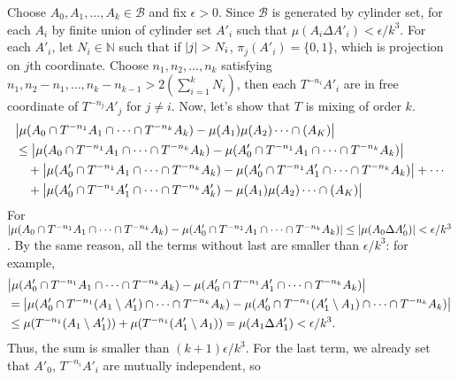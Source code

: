 \documentclass[12pt]{article}
\newenvironment{problem}[2][Problem]{\begin{trivlist}
\item[\hskip \labelsep {\bfseries #1}\hskip \labelsep {\bfseries #2.}]}{\end{trivlist}}
\begin{document}
\begin{problem}{6}
\end{problem}
Choose $A_0, A_1, \ldots, A_k\in \mathcal{B}$ and fix $\epsilon>0$. Since $\mathcal{B}$ is generated by cylinder set, for each $A_i$ by finite union of cylinder set $A'_i$ such that $\mu(A_i\Delta A'_i)<\epsilon/k^3$. For each $A'_i$, let $N_i\in\mathbb{N}$ such that if $\abs{j}>N_i$, $\pi_j(A'_i)=\{0,1\}$, which is projection on $j$th coordinate. Choose $n_1, n_2, \ldots, n_k$ satisfying $n_1, n_2-n_1, \ldots, n_k-n_{k-1}>2\left(\sum\limits_{i=1}^k N_i\right)$, then each $T^{-n_i}A'_i$ are in free coordinate of $T^{-n_j}A'_j$ for $j\neq i$. Now, let's show that $T$ is mixing of order $k$.
\begin{equation*}
    \begin{split}
        &\abs{\mu(A_0\cap T^{-n_1}A_1\cap\cdots\cap T^{-n_k}A_k)-\mu(A_1)\mu (A_2)\cdots \cap(A_K)}\\
        &\leq \abs{\mu(A_0\cap T^{-n_1}A_1\cap\cdots\cap T^{-n_k}A_k)-\mu(A'_0\cap T^{-n_1}A_1\cap\cdots\cap T^{-n_k}A_k)}\\
        & \quad+\abs{\mu(A'_0\cap T^{-n_1}A_1\cap\cdots\cap T^{-n_k}A_k)-\mu(A'_0\cap T^{-n_1}A'_1\cap\cdots\cap T^{-n_k}A_k)}+\cdots\\
        & \quad+\abs{\mu(A'_0\cap T^{-n_1}A'_1\cap\cdots\cap T^{-n_k}A'_k)-\mu(A_1)\mu (A_2)\cdots \cap(A_K)}
    \end{split}
\end{equation*}
For $\abs{\mu(A_0\cap T^{-n_1}A_1\cap\cdots\cap T^{-n_k}A_k)-\mu(A'_0\cap T^{-n_1}A_1\cap\cdots\cap T^{-n_k}A_k)}\leq \abs{\mu(A_0\Delta A'_0)}<\epsilon/k^3$. By the same reason, all the terms without last are smaller than $\epsilon/k^3$: for example, 
\begin{equation*}
\begin{split}
    &\abs{\mu(A'_0\cap T^{-n_1}A_1\cap\cdots\cap T^{-n_k}A_k)-\mu(A'_0\cap T^{-n_1}A'_1\cap\cdots\cap T^{-n_k}A_k)}\\
    &=\abs{\mu(A'_0\cap T^{-n_1}(A_1\setminus A'_1)\cap\cdots\cap T^{-n_k}A_k)-\mu(A'_0\cap T^{-n_1}(A'_1\setminus A_1)\cap\cdots\cap T^{-n_k}A_k)}\\
    &\leq \mu(T^{-n_1}(A_1\setminus A'_1))+\mu(T^{-n_1}(A'_1\setminus A_1))=\mu(A_1\Delta A'_1)<\epsilon/k^3.
\end{split}
\end{equation*}
Thus, the sum is smaller than $(k+1)\epsilon/k^3$. For the last term, we already set that $A'_0$, $T^{-n_i}A'_i$ are mutually independent, so 
\end{document}
